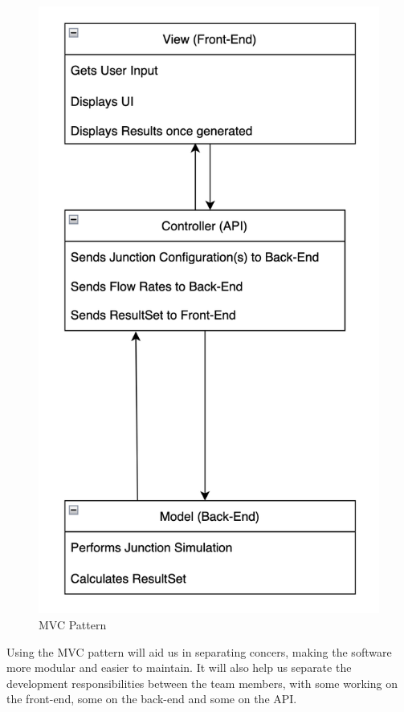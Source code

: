 \documentclass{article}
\begin{document}
\begin{figure}[H]
    \centering
    \includegraphics[width=\textwidth]{pattern.png}
    \caption{MVC Pattern}
    \label{pattern}
\end{figure}

Using the MVC pattern will aid us in separating concers, making the software more modular and easier to maintain. It will also help us separate the development responsibilities between the team members, with some working on the front-end, some on the back-end and some on the API.
\end{document}
